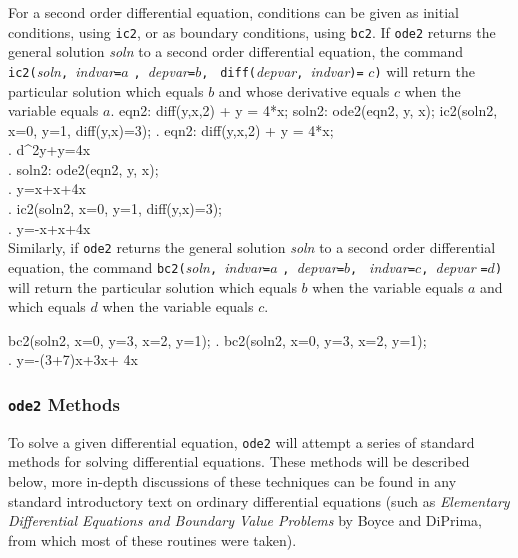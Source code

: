 For a second order differential equation, conditions can be given as
initial conditions, using \texttt{ic2}, or as boundary conditions,
using \texttt{bc2}.  If \texttt{ode2} returns the general solution
\textit{soln} to a second order differential equation, the command
\texttt{ic2(}\textit{soln}\texttt{, }\textit{indvar}\texttt{=}$a$%
\texttt{, }\textit{depvar}\texttt{=}$b$\texttt{, }%
\texttt{diff(}\textit{depvar}\texttt{, }\textit{indvar}\texttt{)=}%
$c$\texttt{)} will return the particular solution which
equals $b$ and whose derivative equals $c$ when the variable equals
$a$.
\beginmaximasession
eqn2: diff(y,x,2) + y = 4*x;
soln2: ode2(eqn2, y, x);
ic2(soln2, x=0, y=1, diff(y,x)=3);
\maximatexsession
{}.  eqn2: diff(y,x,2) + y = 4*x; \\
.   {{d^{2}}}\*y+y=4\*x \\
.  soln2: ode2(eqn2, y, x); \\
.   y=\*\sin x+\*\cos x+4\*x \\
.  ic2(soln2, x=0, y=1, diff(y,x)=3); \\
.   y=-\sin x+\cos x+4\*x \\
\endmaximasession
\noindent
Similarly, if \texttt{ode2} returns the general solution \textit{soln}
to a second order differential equation, the command 
\texttt{bc2(}\textit{soln}\texttt{, }\textit{indvar}\texttt{=}$a$%
\texttt{, }\textit{depvar}\texttt{=}$b$\texttt{, }%
\textit{indvar}\texttt{=}$c$\texttt{, }\textit{\mbox{depvar}}%
\texttt{=}$d$\texttt{)} will return the particular
solution which equals $b$ when the variable equals $a$
and which equals $d$ when the variable equals $c$.

\beginmaximasession
bc2(soln2, x=0, y=3, x=2, y=1);
\maximatexsession
{}.  bc2(soln2, x=0, y=3, x=2, y=1); \\
.   y=-{{\left(3\*+7\right)\*\sin x}}+3\*\cos x+
 4\*x \\
\endmaximasession


\subsubsection{\texttt{ode2} Methods}

To solve a given differential equation, \texttt{ode2} will attempt a
series of standard methods for solving differential equations.  These
methods will be described below, more in-depth discussions of these
techniques can be found in any standard introductory text on ordinary
differential equations (such as \textsl{Elementary Differential
  Equations and Boundary Value Problems} by Boyce and DiPrima, from 
which most of these routines were taken).

